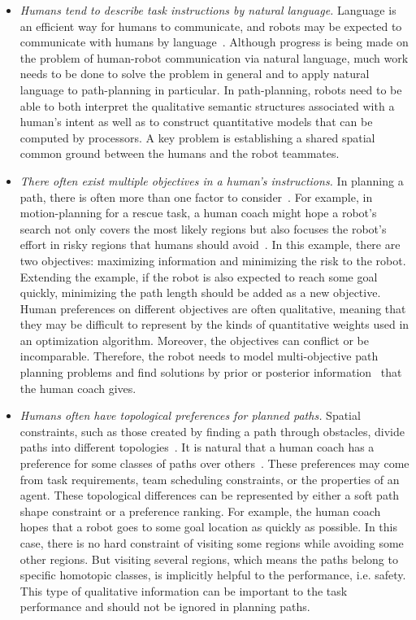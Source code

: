 \documentclass[phd]{byuprop}
\begin{document}
\begin{itemize}

\item {\em Humans tend to describe task instructions by natural language.}
Language is an efficient way for humans to communicate, and robots may be expected to communicate with humans by language~\cite{Kollar:2010:TUN:1734454.1734553,howard2014natural}. 
Although progress is being made on the problem of human-robot communication via natural language, much work needs to be done to solve the problem in general and to apply natural language to path-planning in particular.
In path-planning, robots need to be able to both interpret the qualitative semantic structures associated with a human's intent as well as to construct quantitative models that can be computed by processors.
A key problem is establishing a shared spatial common ground between the humans and the robot teammates.

\item {\em There often exist multiple objectives in a human's instructions.}
In planning a path, there is often more than one factor to consider~\cite{Ahmed2013}.
For example, in motion-planning for a rescue task, a human coach might hope a robot's search not only covers the most likely regions but also focuses the robot's effort in risky regions that humans should avoid~\cite{Yi2014}.
In this example, there are two objectives: maximizing information and minimizing the risk to the robot.
Extending the example, if the robot is also expected to reach some goal quickly, minimizing the path length should be added as a new objective.
Human preferences on different objectives are often qualitative, meaning that they may be difficult to represent by the kinds of quantitative weights used in an optimization algorithm.
Moreover, the objectives can conflict or be incomparable.
Therefore, the robot needs to model multi-objective path planning problems and find solutions by prior or posterior information~\cite{Miettinen1999} that the human coach gives.

\item {\em Humans often have topological preferences for planned paths.}
Spatial constraints, such as those created by finding a path through obstacles, divide paths into different topologies~\cite{Bhattachary2010}.
It is natural that a human coach has a preference for some classes of paths over others~\cite{Yi2014}.
These preferences may come from task requirements, team scheduling constraints, or the properties of an agent.
These topological differences can be represented by either a soft path shape constraint or a preference ranking.
For example, the human coach hopes that a robot goes to some goal location as quickly as possible.
In this case, there is no hard constraint of visiting some regions while avoiding some other regions.
But visiting several regions, which means the paths belong to specific homotopic classes, is implicitly helpful to the performance, i.e. safety.
This type of qualitative information can be important to the task performance and should not be ignored in planning paths.

\end{itemize} 
\end{document}
